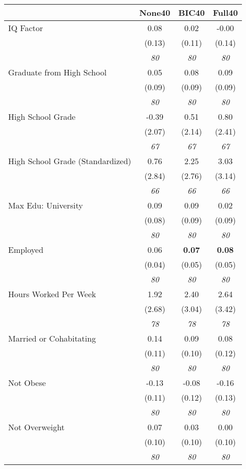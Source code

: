 \begin{tabular}{l c c c}
\toprule
 & None40 & BIC40 & Full40 \\
\midrule
IQ Factor & 0.08 & 0.02 & -0.00 \\
& (0.13) & (0.11) & (0.14) \\
& \textit{ 80 } & \textit{ 80 } & \textit{ 80 } \\
Graduate from High School & 0.05 & 0.08 & 0.09 \\
& (0.09) & (0.09) & (0.09) \\
& \textit{ 80 } & \textit{ 80 } & \textit{ 80 } \\
High School Grade & -0.39 & 0.51 & 0.80 \\
& (2.07) & (2.14) & (2.41) \\
& \textit{ 67 } & \textit{ 67 } & \textit{ 67 } \\
High School Grade (Standardized) & 0.76 & 2.25 & 3.03 \\
& (2.84) & (2.76) & (3.14) \\
& \textit{ 66 } & \textit{ 66 } & \textit{ 66 } \\
Max Edu: University & 0.09 & 0.09 & 0.02 \\
& (0.08) & (0.09) & (0.09) \\
& \textit{ 80 } & \textit{ 80 } & \textit{ 80 } \\
Employed & 0.06 & \textbf{ 0.07 } & \textbf{ 0.08 } \\
& (0.04) & (0.05) & (0.05) \\
& \textit{ 80 } & \textit{ 80 } & \textit{ 80 } \\
Hours Worked Per Week & 1.92 & 2.40 & 2.64 \\
& (2.68) & (3.04) & (3.42) \\
& \textit{ 78 } & \textit{ 78 } & \textit{ 78 } \\
Married or Cohabitating & 0.14 & 0.09 & 0.08 \\
& (0.11) & (0.10) & (0.12) \\
& \textit{ 80 } & \textit{ 80 } & \textit{ 80 } \\
Not Obese & -0.13 & -0.08 & -0.16 \\
& (0.11) & (0.12) & (0.13) \\
& \textit{ 80 } & \textit{ 80 } & \textit{ 80 } \\
Not Overweight & 0.07 & 0.03 & 0.00 \\
& (0.10) & (0.10) & (0.10) \\
& \textit{ 80 } & \textit{ 80 } & \textit{ 80 } \\

\end{tabular}
